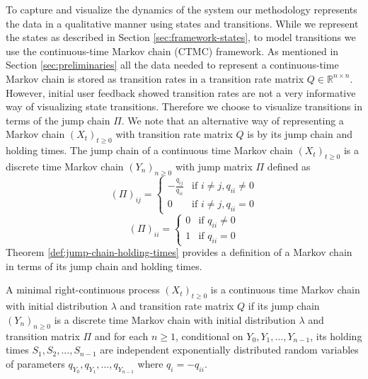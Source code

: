 To capture and visualize the dynamics of the system our methodology represents the data in a qualitative manner
using states and transitions. While we represent the states as described in Section \ref{sec:framework-states},
to model transitions we use the continuous-time Markov chain (CTMC) framework.
As mentioned in Section \ref{sec:preliminaries} all the data needed to represent a continuous-time Markov chain
is stored as transition rates in a transition rate matrix $Q \in \mathbb{R}^{n \times n}$. However, initial user
feedback showed transition rates are not a very informative way of visualizing state transitions. Therefore
we choose to visualize transitions in terms of the jump chain $\Pi$.
We note that an alternative way of representing a Markov chain $(X_t)_{t \ge 0}$ with transition rate matrix $Q$
is by its jump chain and holding times. The jump chain of a continuous time Markov chain $(X_t)_{t \ge 0}$ is
a discrete time Markov chain $(Y_n)_{n \ge 0}$ with jump matrix $\Pi$ defined as
\begin{equation}
	\nonumber
	\left(\Pi\right)_{ij} = 
		\left\{
			\begin{array}{ll}
				-\frac{q_{ij}}{q_{ii}} & \mbox{if } i \ne j, q_{ii} \ne 0 \\
				0 & \mbox{if } i \ne j, q_{ii} = 0
			\end{array}
		\right.
\end{equation}
\begin{equation}
	\nonumber
	\left(\Pi\right)_{ii} = 
		\left\{
			\begin{array}{ll}
				0 & \mbox{if } q_{ii} \ne 0 \\
				1 & \mbox{if } q_{ii} = 0
			\end{array}
		\right.
\end{equation}
Theorem \ref{def:jump-chain-holding-times} provides a definition of a Markov chain in terms of its jump chain and holding times.

\begin{defn}
	\label{def:jump-chain-holding-times}
	A minimal right-continuous process $(X_t)_{t \ge 0}$ is a continuous time Markov chain with initial
	distribution $\lambda$ and transition rate matrix $Q$ if its jump chain $(Y_n)_{n \ge 0}$ is a 
	discrete time Markov chain with initial distribution $\lambda$ and transition matrix $\Pi$ and
	for each $n \ge 1$, conditional on $Y_0, Y_1, ..., Y_{n-1}$, its holding times $S_1, S_2, ..., S_{n-1}$
	are independent exponentially distributed random variables of parameters $q_{Y_0}, q_{Y_1}, ..., q_{Y_{n-1}}$
	where $q_i = -q_{ii}$.
\end{defn}

